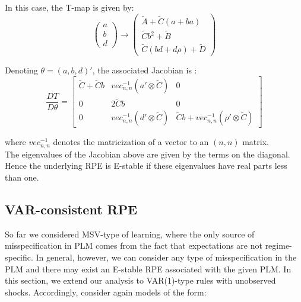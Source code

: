 \documentclass[12pt,reqno]{article}
\numberwithin{equation}{section}
\begin{document}
In this case, the T-map is given by: \\

$$
\begin{pmatrix} a \\ b \\ d \end{pmatrix} \rightarrow \begin{pmatrix} \tilde{A} + \tilde{C} (a+ba) \\ \tilde{C} b^2 + \tilde{B} \\  \tilde{C} (bd+d \rho) + \tilde{D} \end{pmatrix}
$$

Denoting $\theta = (a,b,d)' $, the associated Jacobian is : \\

$$ \frac{ D T } { D\theta }  = \begin{bmatrix} \tilde{C} + \tilde{C} b & vec_{n,n}^{-1} (a' \otimes \tilde{C}) & 0 \\
0 & 2 \tilde{C} b & 0 \\
0 & vec_{n,n}^{-1}(d' \otimes \tilde{C} ) & \tilde{C} b + vec_{n,n}^{-1} (\rho' \otimes \tilde{C} ) \end{bmatrix} $$

where $ vec_{n,n}^{-1} $ denotes the matricization of a vector to an $(n,n) $ matrix. \\

The eigenvalues of the Jacobian above are given by the terms on the diagonal. Hence the underlying RPE is E-stable if these eigenvalues have real parts less than one. \\






\subsection{VAR-consistent RPE} 

So far we considered MSV-type of learning, where the only source of misspecification in PLM comes from the fact that expectations are not regime-specific. In general, however, we can consider any type of misspecification in the PLM and there may exist an E-stable RPE associated with the given PLM. In this section, we extend our analysis to VAR(1)-type rules with unobserved shocks. 
Accordingly, consider again models of the form:
\end{document}
